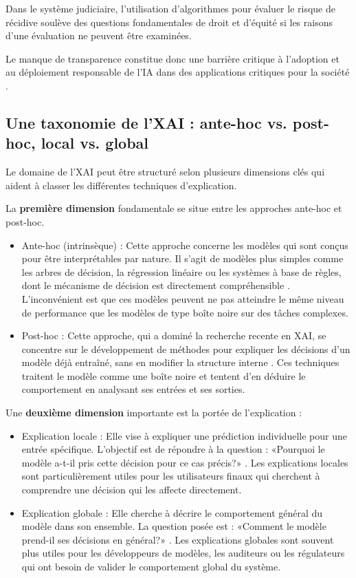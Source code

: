 Dans le système judiciaire, l'utilisation d'algorithmes pour évaluer le risque de récidive soulève des questions fondamentales de droit et d'équité si les raisons d'une évaluation ne peuvent être examinées. 

Le manque de transparence constitue donc une barrière critique à l'adoption et au déploiement responsable de l'IA dans des applications critiques pour la société \citep{Siganos2019Explaining, Solanke2022}.
\subsection{Une taxonomie de l'XAI : ante-hoc vs. post-hoc, local vs. global}
Le domaine de l'XAI peut être structuré selon plusieurs dimensions clés qui aident à classer les différentes techniques d'explication. 
\vspace{2em}

La \textbf{première dimension} fondamentale se situe entre les approches ante-hoc et post-hoc.

\begin{itemize}[label=\textbullet]
    \item Ante-hoc (intrinsèque) : Cette approche concerne les modèles qui sont conçus pour être interprétables par nature. Il s'agit de modèles plus simples comme les arbres de décision, la régression linéaire ou les systèmes à base de règles, dont le mécanisme de décision est directement compréhensible \citet{Rudin2019}. 
    L'inconvénient est que ces modèles peuvent ne pas atteindre le même niveau de performance que les modèles de type boîte noire sur des tâches complexes.
    \item Post-hoc : Cette approche, qui a dominé la recherche recente en XAI, se concentre sur le développement de méthodes pour expliquer les décisions d'un modèle déjà entraîné, sans en modifier la structure interne \citep{Sankarapu2022A}. Ces techniques traitent le modèle comme une boîte noire et tentent d'en déduire le comportement en analysant ses entrées et ses sorties.
\end{itemize}

Une \textbf{deuxième dimension} importante est la portée de l'explication :
\begin{itemize}[label=\textbullet]
    \item Explication locale : Elle vise à expliquer une prédiction individuelle pour une entrée spécifique. L'objectif est de répondre à la question : «Pourquoi le modèle a-t-il pris cette décision pour ce cas précis?» \citep{Ribeiro2016Why, Sankarapu2022A}. Les explications locales sont particulièrement utiles pour les utilisateurs finaux qui cherchent à comprendre une décision qui les affecte directement.
    \vspace{1em}
    \item Explication globale : Elle cherche à décrire le comportement général du modèle dans son ensemble. La question posée est : «Comment le modèle prend-il ses décisions en général?» \citet{Lundberg2023A}. Les explications globales sont souvent plus utiles pour les développeurs de modèles, les auditeurs ou les régulateurs qui ont besoin de valider le comportement global du système.
\end{itemize}

